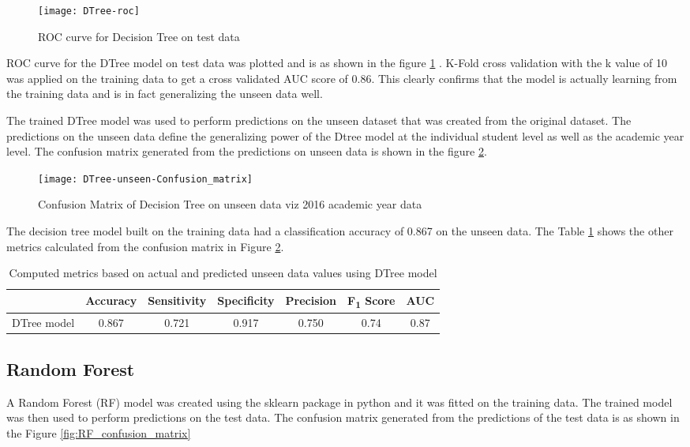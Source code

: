 \documentclass[11pt,openright]{report}
\begin{document}
 \begin{figure}[!htbp]
	\centering
	\texttt{[image: DTree-roc]}
	\caption{ROC curve for Decision Tree on test data}
	\label{fig:DTree_roc}
\end{figure} 

ROC curve for the DTree model on test data was plotted and is as shown in the figure \ref{fig:DTree_roc} . K-Fold cross validation with the k value of 10 was applied on the training data to get a cross validated AUC score of 0.86. This clearly confirms that the model is actually learning from the training data and is in fact generalizing the unseen data well.

The trained DTree model was used to perform predictions on the unseen dataset that was created from the original dataset. The predictions on the unseen data define the generalizing power of the Dtree model at the individual student level as well as the academic year level. The confusion matrix generated from the predictions on unseen data is shown in the figure \ref{fig:DTree_unseen_confusion_matrix}.

  \begin{figure}[!htb]
	\centering
	\texttt{[image: DTree-unseen-Confusion\_matrix]}
	\caption{Confusion Matrix of Decision Tree on unseen data viz 2016 academic year data}
	\label{fig:DTree_unseen_confusion_matrix}
\end{figure} 


The decision tree model built on the training data had a classification accuracy of 0.867 on the unseen data. The Table \ref{table:DTree-unseen_metrics_db} shows the other metrics calculated from the confusion matrix in Figure \ref{fig:DTree_unseen_confusion_matrix}.

\begin{table}[!htb]
	\renewcommand{\arraystretch}{1.3}
	\caption{Computed metrics based on actual and predicted unseen data values using DTree model}
	\label{table:DTree-unseen_metrics_db}
	\centering
	\begin{tabular}{|c|c|c|c|c|c|c|}
    \hline
  	 & \bfseries Accuracy & \bfseries Sensitivity & \bfseries Specificity & \bfseries Precision & \bfseries F\textsubscript{1} Score  & \bfseries AUC\\  
    \hline
	DTree model & 0.867 & 0.721 & 0.917 & 0.750 & 0.74 & 0.87 \\ \hline
	\end{tabular} 
\end{table}


\subsection {Random Forest}
A Random Forest (RF) model was created using the sklearn package in python and it was fitted on the training data. The trained model was then used to perform predictions on the test data. The confusion matrix generated from the predictions of the test data is as shown in the Figure \ref{fig:RF_confusion_matrix}
\end{document}

